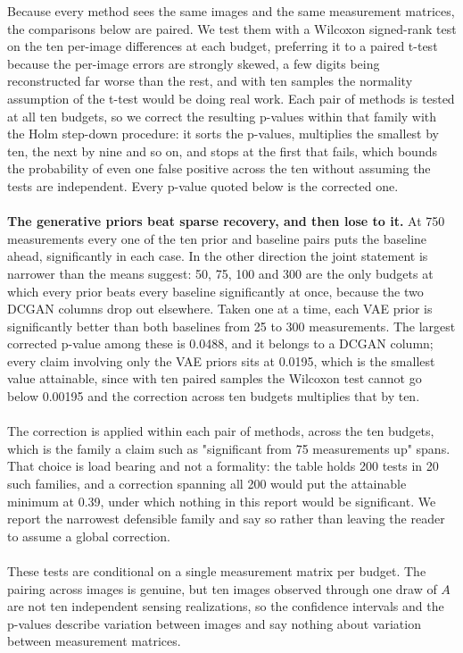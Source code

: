 Because every method sees the same images and the same measurement matrices, the comparisons below are paired. We test them with a Wilcoxon signed-rank test on the ten per-image differences at each budget, preferring it to a paired t-test because the per-image errors are strongly skewed, a few digits being reconstructed far worse than the rest, and with ten samples the normality assumption of the t-test would be doing real work. Each pair of methods is tested at all ten budgets, so we correct the resulting p-values within that family with the Holm step-down procedure: it sorts the p-values, multiplies the smallest by ten, the next by nine and so on, and stops at the first that fails, which bounds the probability of even one false positive across the ten without assuming the tests are independent. Every p-value quoted below is the corrected one.
\\\\
\textbf{The generative priors beat sparse recovery, and then lose to it.} At 750 measurements every one of the ten prior and baseline pairs puts the baseline ahead, significantly in each case. In the other direction the joint statement is narrower than the means suggest: 50, 75, 100 and 300 are the only budgets at which every prior beats every baseline significantly at once, because the two DCGAN columns drop out elsewhere. Taken one at a time, each VAE prior is significantly better than both baselines from 25 to 300 measurements. The largest corrected p-value among these is 0.0488, and it belongs to a DCGAN column; every claim involving only the VAE priors sits at 0.0195, which is the smallest value attainable, since with ten paired samples the Wilcoxon test cannot go below 0.00195 and the correction across ten budgets multiplies that by ten.
\\\\
The correction is applied within each pair of methods, across the ten budgets, which is the family a claim such as "significant from 75 measurements up" spans. That choice is load bearing and not a formality: the table holds 200 tests in 20 such families, and a correction spanning all 200 would put the attainable minimum at 0.39, under which nothing in this report would be significant. We report the narrowest defensible family and say so rather than leaving the reader to assume a global correction.
\\\\
These tests are conditional on a single measurement matrix per budget. The pairing across images is genuine, but ten images observed through one draw of \( A \) are not ten independent sensing realizations, so the confidence intervals and the p-values describe variation between images and say nothing about variation between measurement matrices.
